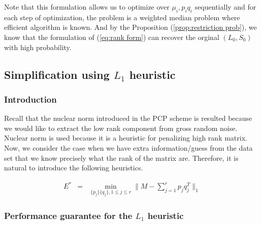 Note that this formulation allows us to optimize over $\mu_{i},p_{i}q_{i}$
sequentially and for each step of optimization, the problem is a weighted
median problem where efficient algorithm is known. And by the Proposition
(\ref{prop:restriction prob}), we know that the formulation of (\ref{eq:rank form})
can recover the orginal $(L_{0},S_{0})$ with high probability.


\subsection{Simplification using $L_{1}$ heuristic}


\subsubsection{Introduction}

Recall that the nuclear norm introduced in the PCP scheme is resulted
because we would like to extract the low rank component from gross
random noise. Nuclear norm is used because it is a heuristic for penalizing
high rank matrix. Now, we consider the case when we have extra information/guess
from the data set that we know precisely what the rank of the matrix
are. Therefore, it is natural to introduce the following heuristics.

\begin{eqnarray}
E^{*} & = & \min_{\{p_{j}\}\{q_{j}\},1\le j\le r}\|M-\sum_{j=1}^{r}p_{j}q_{j}^{T}\|_{1}\label{heu}
\end{eqnarray}



\subsubsection{Performance guarantee for the $L_1$ heuristic}

